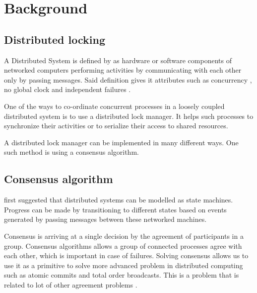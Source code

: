 \chapter{Background}
\label{chapter:background}

\section{Distributed locking}

A Distributed System is defined by \citet[]{coulouris2005distributed} as 
hardware or software components of networked computers performing activities by
communicating with each other only by passing messages. Said definition gives
it attributes such as concurrency%
, no global clock%
and independent failures
.

One of the ways to co-ordinate concurrent processes in a loosely coupled 
distributed system is to use a distributed lock manager. It helps such
processes to synchronize their activities or to serialize their access to
shared resources.

A distributed lock manager can be implemented in many different ways. One such
method is using a consensus algorithm.

\section{Consensus algorithm}

\citet{Lamclocks} first suggested that distributed systems can be modelled as
state machines. Progress can be made by transitioning to different states based
on events generated by passing messages between these networked machines.

Consensus is arriving at a single decision by the agreement of participants in a
group. Consensus algorithms allows a group of connected processes agree with 
each other, which is important in case of failures. Solving consensus allows
us to use it as a primitive to solve more advanced problem in distributed
computing such as atomic commits and total order broadcasts. This is a problem
that is related to lot of other agreement problems \citep{GS01}.

